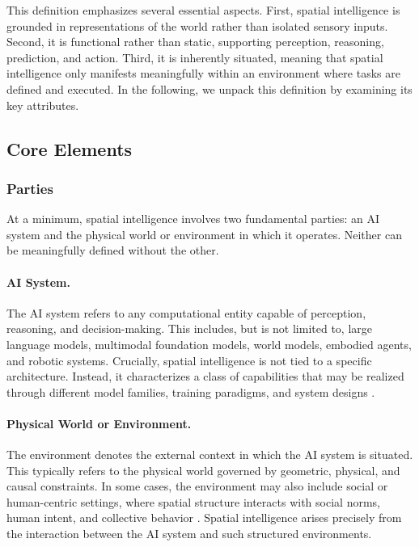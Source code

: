 This definition emphasizes several essential aspects.
First, spatial intelligence is grounded in representations of the world rather than isolated sensory inputs.
Second, it is functional rather than static, supporting perception, reasoning, prediction, and action.
Third, it is inherently situated, meaning that spatial intelligence only manifests meaningfully within an environment where tasks are defined and executed.
In the following, we unpack this definition by examining its key attributes.






\subsection{Core Elements}
\label{subsec:p1-sec2-core-elements}

\subsubsection{Parties}

At a minimum, spatial intelligence involves two fundamental parties: an AI system and the physical world or environment in which it operates.
Neither can be meaningfully defined without the other.

\paragraph{AI System.}
The AI system refers to any computational entity capable of perception, reasoning, and decision-making.
This includes, but is not limited to, large language models, multimodal foundation models, world models, embodied agents, and robotic systems.
Crucially, spatial intelligence is not tied to a specific architecture.
Instead, it characterizes a class of capabilities that may be realized through different model families, training paradigms, and system designs \cite{feng2025embodied,zhang2026theory}.

\paragraph{Physical World or Environment.}
The environment denotes the external context in which the AI system is situated.
This typically refers to the physical world governed by geometric, physical, and causal constraints.
In some cases, the environment may also include social or human-centric settings, where spatial structure interacts with social norms, human intent, and collective behavior \cite{hall1966hidden}.
Spatial intelligence arises precisely from the interaction between the AI system and such structured environments.



